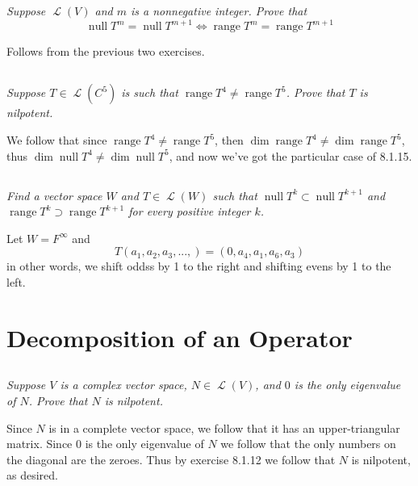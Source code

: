 \documentclass[11pt,oneside,titlepage]{book}
\DeclareMathOperator \map {\mathcal {L}}
\DeclareMathOperator \ns {null}
\DeclareMathOperator \range {range}
\begin{document}
\subsection{}

\textit{Suppose $\map(V)$ and $m$ is a nonnegative integer. Prove that
  $$\ns T^m = \ns T^{m + 1} \iff \range T^m = \range T^{m + 1}$$
}

Follows from the previous two exercises.

\subsection{}

\textit{Suppose $T \in \map(C^5)$ is such that $\range T^4 \neq \range T^5$. Prove that $T$ is
  nilpotent.}

We follow that since $\range T^4 \neq \range T^5$, then
$\dim \range T^4 \neq \dim \range T^5$, thus $\dim \ns T^4 \neq \dim \ns T^5$,
and now we've got the particular case of 8.1.15.

\subsection{}

\textit{Find a vector space $W$ and $T \in \map(W)$ such that $\ns T^k \subset \ns T^{k + 1}$
  and $\range T^k \supset \range T^{k + 1}$ for every positive integer $k$.}

Let $W = F^\infty$ and
$$T(a_1, a_2, a_3, ...,) = (0, a_4, a_1, a_6, a_3)$$
in other words, we shift oddss by 1 to the right and shifting evens by 1 to the left.


\section{Decomposition of an Operator}

\subsection{}

\textit{Suppose $V$ is a complex vector space, $N \in \map(V)$, and $0$ is the only eigenvalue
  of $N$. Prove that $N$ is nilpotent.}

Since $N$ is in a complete vector space, we follow that it has an upper-triangular matrix.
Since $0$ is the only eigenvalue of $N$ we follow that the only numbers on the diagonal
are the zeroes. Thus by exercise 8.1.12 we follow that $N$ is nilpotent, as desired.
\end{document}

